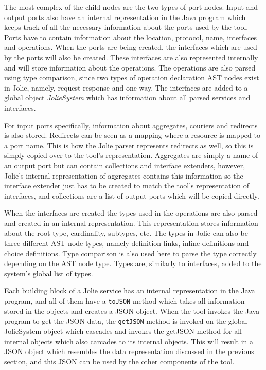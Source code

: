 The most complex of the child nodes are the two types of port nodes. Input and output ports also have an internal representation in the Java program which keeps track of all the necessary information about the ports used by the tool.
Ports have to contain information about the location, protocol, name, interfaces and operations.
When the ports are being created, the interfaces which are used by the ports will also be created. These interfaces are also represented internally and will store information about the operations.
The operations are also parsed using type comparison, since two types of operation declaration AST nodes exist in Jolie, namely, request-response and one-way.
The interfaces are added to a global object \textit{JolieSystem} which has information about all parsed services and interfaces.

For input ports specifically, information about aggregates, couriers and redirects is also stored. Redirects can be seen as a mapping where a resource is mapped to a port name. This is how the Jolie parser represents redirects as well, so this is simply copied over to the tool's representation.
Aggregates are simply a name of an output port but can contain collections and interface extenders, however, Jolie's internal representation of aggregates contains this information so the interface extender just has to be created to match the tool's representation of interfaces, and collections are a list of output ports which will be copied directly.

When the interfaces are created the types used in the operations are also parsed and created in an internal representation.
This representation stores information about the root type, cardinality, subtypes, etc.
The types in Jolie can also be three different AST node types, namely definition links, inline definitions and choice definitions. Type comparison is also used here to parse the type correctly depending on the AST node type.
Types are, similarly to interfaces, added to the system's global list of types.

Each building block of a Jolie service has an internal representation in the Java program, and all of them have a \texttt{toJSON} method which takes all information stored in the objects and creates a JSON object.
When the tool invokes the Java program to get the JSON data, the \texttt{getJSON} method is invoked on the global JolieSystem object which cascades and invokes the getJSON method for all internal objects which also carcades to its internal objects.
This will result in a JSON object which resembles the data representation discussed in the previous section, and this JSON can be used by the other components of the tool.

